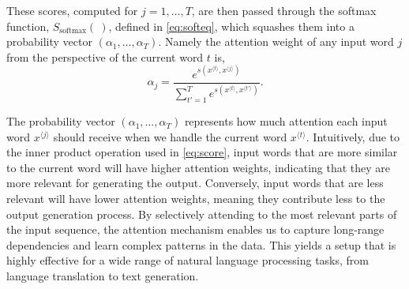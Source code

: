 These scores, computed for $j = 1,\ldots,T$, are then passed through the softmax function, $S_{\text{softmax}}(~)$, defined in \eqref{eq:softeq}, which squashes them into a probability vector $(\alpha_1, \ldots, \alpha_T)$. Namely the attention weight of any input word $j$ from the perspective of the current word $t$ is,
%
\begin{equation}
\label{eq:attentionweight}
\alpha_{j} = \frac{e^{s(x^{{\langle t \rangle}},x^{{\langle j \rangle}})}}{\sum_{t'=1}^T e^{s(x^{{\langle t \rangle}},x^{{\langle t' \rangle}})}}.
\end{equation}
%

The probability vector $(\alpha_1, \ldots, \alpha_T)$ represents how much attention each input word $x^{{\langle j \rangle}}$ should receive when we handle the current word $x^{{\langle t \rangle}}$. Intuitively, due to the inner product operation used in \eqref{eq:score}, input words that are more similar to the current word will have higher attention weights, indicating that they are more relevant for generating the output. Conversely, input words that are less relevant will have lower attention weights, meaning they contribute less to the output generation process. By selectively attending to the most relevant parts of the input sequence, the attention mechanism enables us to capture long-range dependencies and learn complex patterns in the data. This yields a setup that is highly effective for a wide range of natural language processing tasks, from language translation to text generation.
